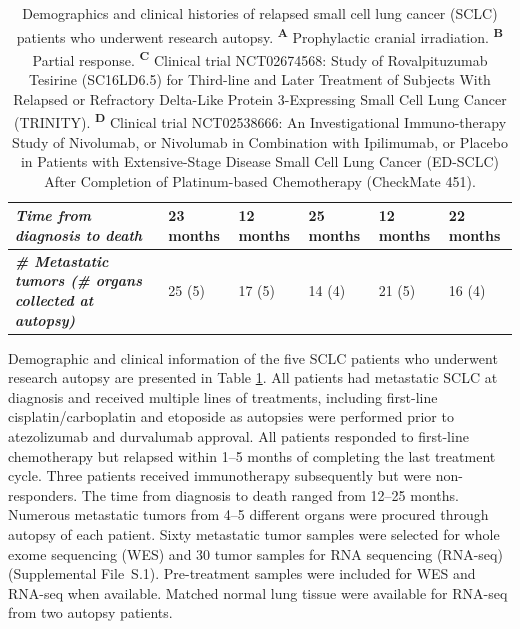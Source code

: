 \begin{table}[htbp]
\begin{center}
\begin{tabular}{p{5.5em}p{6.2em}p{6.4em}p{6.2em}p{7.285em}p{7.285em}}
            \hline
            \textit{\textbf{Time from diagnosis to death}} & 23 months & 12 months & 25 months & 12 months & 22 months \bigstrut\\
            \hline
            \textit{\textbf{\# Metastatic tumors (\# organs collected at autopsy)}} & 25 (5) & 17 (5) & 14 (4) & 21 (5) & 16 (4) \bigstrut\\
            \hline
        \end{tabular}
    \end{center}
    \caption[Demographics and clinical histories of five SCLC patients.]{Demographics and clinical histories of relapsed small cell lung cancer (SCLC) patients who underwent research autopsy. \textsuperscript{\textbf{A}}\! Prophylactic cranial irradiation. \textsuperscript{\textbf{B}}\! Partial response. \textsuperscript{\textbf{C}}\! Clinical trial NCT02674568: Study of Rovalpituzumab Tesirine (SC16LD6.5) for Third-line and Later Treatment of Subjects With Relapsed or Refractory Delta-Like Protein 3-Expressing Small Cell Lung Cancer (TRINITY)\@. \textsuperscript{\textbf{D}}\! Clinical trial NCT02538666: An Investigational Immuno-therapy Study of Nivolumab, or Nivolumab in Combination with Ipilimumab, or Placebo in Patients with Extensive-Stage Disease Small Cell Lung Cancer (ED-SCLC) After Completion of Platinum-based Chemotherapy (CheckMate 451).}
    \label{table:sclc:clinical_hx}
\end{table}

Demographic and clinical information of the five SCLC patients who underwent research autopsy are presented in Table \ref{table:sclc:clinical_hx}. All patients had metastatic SCLC at diagnosis and received multiple lines of treatments, including first-line cisplatin/carboplatin and etoposide as autopsies were performed prior to atezolizumab and durvalumab approval. All patients responded to first-line chemotherapy but relapsed within 1--5 months of completing the last treatment cycle. Three patients received immunotherapy subsequently but were non-responders. The time from diagnosis to death ranged from 12--25 months. Numerous metastatic tumors from 4--5 different organs were procured through autopsy of each patient. Sixty metastatic tumor samples were selected for whole exome sequencing (WES) and 30 tumor samples for RNA sequencing (RNA-seq) (Supplemental File~S\thechapter{}.1). Pre-treatment samples were included for WES and RNA-seq when available. Matched normal lung tissue were available for RNA-seq from two autopsy patients.

